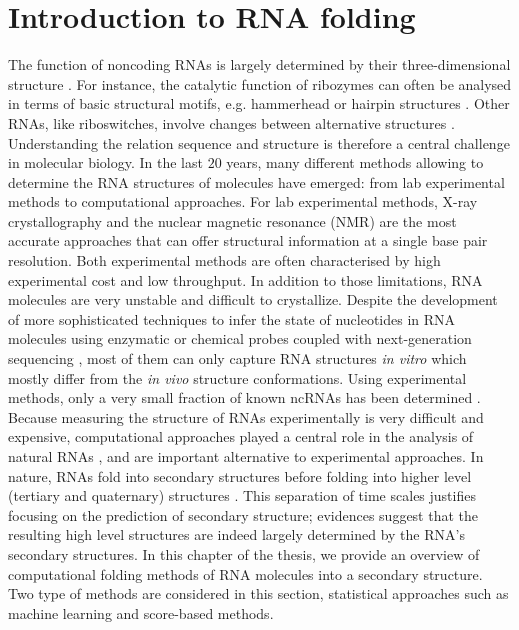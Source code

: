 \chapter{Introduction to RNA folding}\label{ch:folding}
The function of noncoding RNAs is largely determined by their three-dimensional structure \cite{cech2014noncoding}. For instance, the catalytic function of ribozymes can often be analysed in terms of basic structural motifs, e.g. hammerhead or hairpin structures \cite{doherty2001ribozyme}. Other RNAs, like riboswitches, involve changes between alternative structures  \cite{vitreschak04_ribos}. Understanding the relation sequence and structure is therefore a central challenge in molecular biology. In the last $20$ years, many different methods allowing to determine the RNA structures of molecules have emerged: from lab experimental methods to computational approaches. For lab experimental methods, X-ray crystallography and the nuclear magnetic resonance (NMR)  are the most accurate approaches that can offer structural information at a single base pair resolution. Both experimental methods are often characterised by high experimental cost and low throughput. In addition to those limitations, RNA molecules are very unstable and difficult to crystallize. Despite the development of more sophisticated techniques to infer the state of nucleotides in RNA molecules using enzymatic \cite{kertesz2010genome, underwood2010fragseq} or chemical probes \cite{tijerina2007dms, wilkinson2006selective} coupled with next-generation sequencing \cite{bevilacqua2016genome, tian2016rna}, most of them can only capture RNA structures \textit{in vitro} which mostly differ from the \textit{in vivo} structure conformations. Using experimental methods, only a very small fraction of known ncRNAs has been determined \cite{rnacentral2017rnacentral}.  Because measuring the structure of RNAs experimentally is very difficult and expensive, computational approaches played a central role in the analysis of natural RNAs \cite{seetin2012rna, fallmann2017recent}, and are important alternative to experimental approaches. In nature, RNAs fold into secondary structures before folding into higher level (tertiary and quaternary) structures \cite{brion1997hierarchy,tinoco1999rna}. This separation of time scales justifies focusing on the prediction of secondary structure; evidences suggest that the resulting high level structures are indeed largely determined by the RNA's secondary structures.
In this chapter of the thesis, we provide an overview of computational folding methods of RNA molecules into a secondary structure. Two type of methods are considered in this section, statistical approaches such as machine learning and score-based methods.

